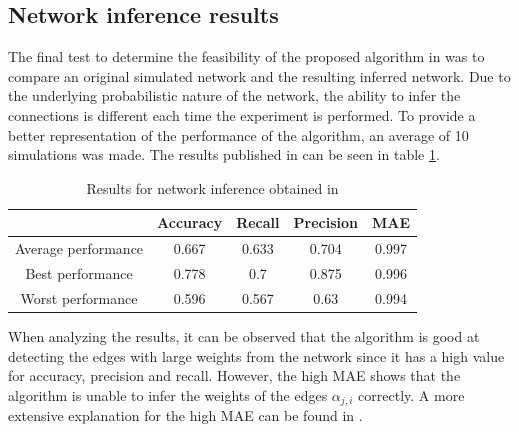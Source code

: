 \subsection{Network inference results}

The final test to determine the feasibility of the proposed algorithm in \cite{alexandru2018estimating} was to compare an original simulated network and the resulting inferred network. Due to the underlying probabilistic nature of the network, the ability to infer the connections is different each time the experiment is performed. To provide a better representation of the performance of the algorithm, an average of 10 simulations was made. The results published in \cite{alexandru2018estimating} can be seen in table \ref{tab:results_pranav}.\\

\begin{table}
    \centering
    \begin{tabular}{|c|c|c|c|c|}
		\hline
		& Accuracy & Recall & Precision & MAE \\
		\hline
		Average performance & 0.667 & 0.633 & 0.704 & 0.997 \\
		\hline
		Best performance & 0.778 & 0.7 & 0.875 & 0.996  \\
		\hline
		Worst performance & 0.596 & 0.567 & 0.63 & 0.994 \\
		\hline
		\end{tabular}
		\caption{Results for network inference obtained in \cite{alexandru2018estimating}}
		\label{tab:results_pranav}
\end{table}

When analyzing the results, it can be observed that the algorithm is good at detecting the edges with large weights from the network since it has a high value for accuracy, precision and recall. However, the high MAE shows that the algorithm is unable to infer the weights of the edges $\alpha_{j,i}$ correctly. A more extensive explanation for the high MAE can be found in \cite{pranav_report}.


